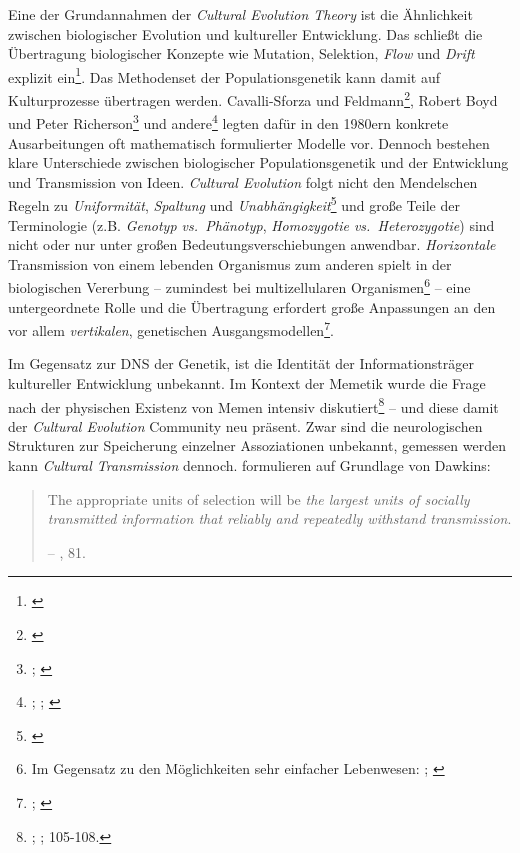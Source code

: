 \documentclass[openany,twoside,twocolumn]{book}
\let\rmarkdownfootnote\footnote%
\def\footnote{\protect\rmarkdownfootnote}
\begin{document}
Eine der Grundannahmen der \emph{Cultural Evolution Theory} ist die Ähnlichkeit zwischen biologischer Evolution und kultureller Entwicklung. Das schließt die Übertragung biologischer Konzepte wie Mutation, Selektion, \emph{Flow} und \emph{Drift} explizit ein\footnote{\textcite{smith_cultural_1992}}. Das Methodenset der Populationsgenetik kann damit auf Kulturprozesse übertragen werden. Cavalli-Sforza und Feldmann\footnote{\textcite{cavalli-sforza_cultural_1981}}, Robert Boyd und Peter Richerson\footnote{\textcite{richerson_dual_1978}; \textcite{boyd_culture_1985}} und andere\footnote{\textcite{campbell_variation_1965}; \textcite{pulliam_programmed_1980}; \textcite{lumsden_genes_1981}} legten dafür in den 1980ern konkrete Ausarbeitungen oft mathematisch formulierter Modelle vor. Dennoch bestehen klare Unterschiede zwischen biologischer Populationsgenetik und der Entwicklung und Transmission von Ideen. \emph{Cultural Evolution} folgt nicht den Mendelschen Regeln zu \emph{Uniformität}, \emph{Spaltung} und \emph{Unabhängigkeit}\footnote{\textcite{mesoudi_pursuing_2017}} und große Teile der Terminologie (z.B. \emph{Genotyp vs.~Phänotyp}, \emph{Homozygotie vs.~Heterozygotie}) sind nicht oder nur unter großen Bedeutungsverschiebungen anwendbar. \emph{Horizontale} Transmission von einem lebenden Organismus zum anderen spielt in der biologischen Vererbung -- zumindest bei multizellularen Organismen\footnote{Im Gegensatz zu den Möglichkeiten sehr einfacher Lebenwesen: \textcite{woese_new_2004}; \textcite{woese_interpreting_2000}} -- eine untergeordnete Rolle und die Übertragung erfordert große Anpassungen an den vor allem \emph{vertikalen}, genetischen Ausgangsmodellen\footnote{\textcite{cavalli-sforza_cultural_1973}; \textcite{feldman_cultural_1976}}.

Im Gegensatz zur DNS der Genetik, ist die Identität der Informationsträger kultureller Entwicklung unbekannt. Im Kontext der Memetik wurde die Frage nach der physischen Existenz von Memen intensiv diskutiert\footnote{\textcite{delius_nature_1991}; \textcite{wilkinson_memes_1999}; \textcite{blackmore_macht_2000} 105-108.} -- und diese damit der \emph{Cultural Evolution} Community neu präsent. Zwar sind die neurologischen Strukturen zur Speicherung einzelner Assoziationen unbekannt, gemessen werden kann \emph{Cultural Transmission} dennoch. \textcite{pocklington_cultural_1997} formulieren auf Grundlage von Dawkins:

\begin{quote}
The appropriate units of selection will be \emph{the largest units of socially transmitted information that reliably and repeatedly withstand transmission}.

-- \textcite{pocklington_cultural_1997}, 81.
\end{quote}
\end{document}
